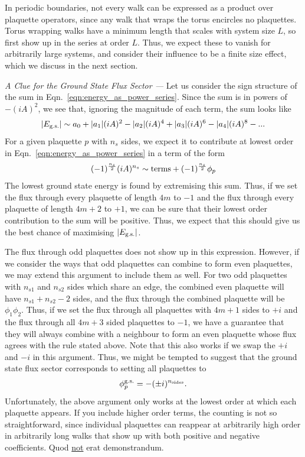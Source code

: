 In periodic boundaries, not every walk can be expressed as a product over plaquette operators, since any walk that wraps the torus encircles no plaquettes. Torus wrapping walks have a minimum length that scales with system size $L$, so first show up in the series at order $L$. Thus, we expect these to vanish for arbitrarily large systems, and consider their influence to be a finite size effect, which we discuss in the next section.

\begin{shaded}
    {\it A Clue for the Ground State Flux Sector --- } Let us consider the sign structure of the sum in Eqn.~\ref{eqn:energy_as_power_series}. Since the sum is in powers of $-(iA)^2$, we see that, ignoring the magnitude of each term, the sum looks like
    \begin{align}
        |E_\textup{g.s.}| \sim a_0 
        + |a_1|(iA)^2 
        - |a_2|(iA)^4 
        + |a_3|(iA)^6
        - |a_4|(iA)^8 - ...
    \end{align}
    For a given plaquette $p$ with $n_s$ sides, we expect it to contribute at lowest order in Eqn.~\ref{eqn:energy_as_power_series} in a term of the form 
    \begin{align}
        (-1)^{\frac{n_s}2}(iA)^{n_s} \sim \textup{terms} +  (-1)^{\frac{n_s}2}\phi_p
    \end{align}
    The lowest ground state energy is found by extremising this sum. Thus, if we set the flux through every plaquette of length $4m$ to $-1$ and the flux through every plaquette of length $4m+2$ to $+1$, we can be sure that their lowest order contribution to the sum will be positive. Thus, we expect that this should give us the best chance of maximising $|E_\textup{g.s.}|$. 

    The flux through odd plaquettes does not show up in this expression. However, if we consider the ways that odd plaquettes can combine to form even plaquettes, we may extend this argument to include them as well. For two odd plaquettes with $n_{s1}$ and $n_{s2}$ sides which share an edge, the combined even plaquette will have $n_{s1}+n_{s2} -2$ sides, and the flux through the combined plaquette will be $\phi_1\phi_2$. Thus, if we set the flux through all plaquettes with $4m+1$ sides to $+i$ and the flux through all $4m+3$ sided plaquettes to $-1$, we have a guarantee that they will always combine with a neighbour to form an even plaquette whose flux agrees with the rule stated above. Note that this also works if we swap the $+i$ and $-i$ in this argument. Thus, we might be tempted to suggest that the ground state flux sector corresponds to setting all plaquettes to 
    \begin{align} \label{eqn:gs_hint}
        \phi^{\textup{g.s.}}_p = -(\pm i)^{n_{\textup{sides}}}.
    \end{align}
    Unfortunately, the above argument only works at the lowest order at which each plaquette appears. If you include higher order terms, the counting is not so straightforward, since individual plaquettes can reappear at arbitrarily high order in arbitrarily long walks that show up with both positive and negative coefficients. Quod \underline{not} erat demonstrandum.

\end{shaded}

